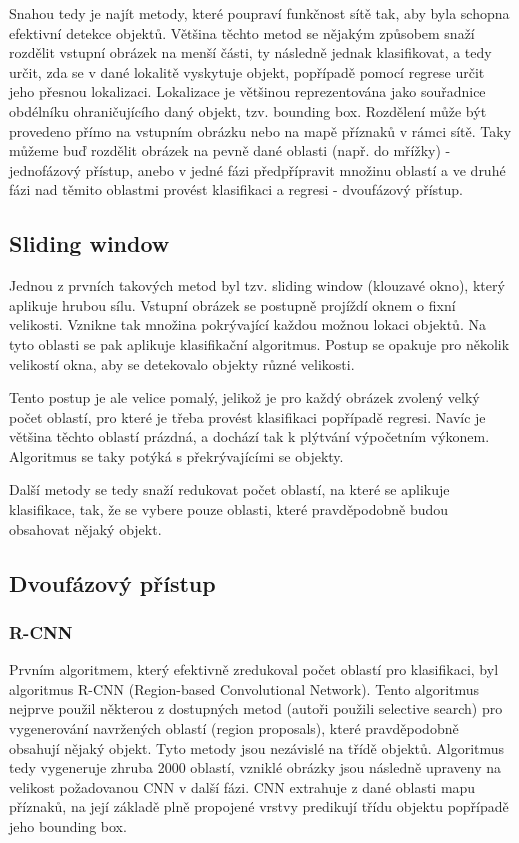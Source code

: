Snahou tedy je najít metody, které poupraví funkčnost sítě tak, aby byla
schopna efektivní detekce objektů. Většina těchto metod se nějakým způsobem
snaží rozdělit vstupní obrázek na menší části, ty následně jednak klasifikovat,
a tedy určit, zda se v dané lokalitě vyskytuje objekt, popřípadě pomocí regrese
určit jeho přesnou lokalizaci. Lokalizace je většinou reprezentována jako
souřadnice obdélníku ohraničujícího daný objekt, tzv. bounding box. Rozdělení
může být provedeno přímo na vstupním obrázku nebo na mapě příznaků v rámci
sítě. Taky můžeme buď rozdělit obrázek na pevně dané oblasti (např. do mřížky)
- jednofázový přístup, anebo v jedné fázi předpřípravit množinu oblastí a ve
druhé fázi nad těmito oblastmi provést klasifikaci a regresi - dvoufázový
přístup.

\subsection{Sliding window}

Jednou z prvních takových metod byl tzv. sliding window (klouzavé okno), který
aplikuje hrubou sílu. Vstupní obrázek se postupně projíždí oknem o fixní
velikosti. Vznikne tak množina pokrývající každou možnou lokaci objektů. Na
tyto oblasti se pak aplikuje klasifikační algoritmus. Postup se opakuje pro
několik velikostí okna, aby se detekovalo objekty různé velikosti.

Tento postup je ale velice pomalý, jelikož je pro každý obrázek zvolený velký
počet oblastí, pro které je třeba provést klasifikaci popřípadě regresi. Navíc
je většina těchto oblastí prázdná, a dochází tak k plýtvání výpočetním výkonem.
Algoritmus se taky potýká s překrývajícími se objekty.

Další metody se tedy snaží redukovat počet oblastí, na které se aplikuje
klasifikace, tak, že se vybere pouze oblasti, které pravděpodobně budou
obsahovat nějaký objekt.

\subsection{Dvoufázový přístup}

\subsubsection{R-CNN}
Prvním algoritmem, který efektivně zredukoval počet oblastí pro klasifikaci,
byl algoritmus R-CNN (Region-based Convolutional Network). \cite{r-cnn} Tento
algoritmus nejprve použil některou z dostupných metod (autoři použili selective
search) pro vygenerování navržených oblastí (region proposals), které
pravděpodobně obsahují nějaký objekt. Tyto metody jsou nezávislé na třídě
objektů. Algoritmus tedy vygeneruje zhruba 2000 oblastí, vzniklé obrázky jsou
následně upraveny na velikost požadovanou CNN v další fázi. CNN extrahuje z
dané oblasti mapu příznaků, na její základě plně propojené vrstvy predikují
třídu objektu popřípadě jeho bounding box.

